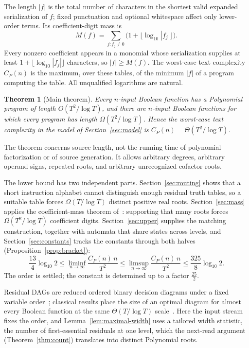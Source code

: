 \documentclass[11pt]{article}
\newtheorem{theorem}{Theorem}[section]
\theoremstyle{remark}
\begin{document}
The length $|f|$ is the total
number of characters in the shortest valid expanded serialization of $f$;
fixed punctuation and optional whitespace affect only lower-order terms.
Its coefficient-digit mass is
\[
  M(f)=\sum_{j:f_j\ne0}\bigl(1+\lfloor\log_{10}|f_j|\rfloor\bigr).
\]
Every nonzero coefficient appears in a monomial whose serialization supplies
at least $1+\lfloor\log_{10}|f_j|\rfloor$ characters, so $|f|\ge M(f)$.
The worst-case text complexity $C_P(n)$ is the maximum, over these tables, of
the minimum $|f|$ of a program computing the table.
All unqualified logarithms are natural.

\begin{theorem}[Main theorem]\label{thm:main}
Every $n$-input Boolean function has a Polynomial program of length
$O(T^2/\log T)$, and there are $n$-input Boolean functions for which every
program has length $\Omega(T^2/\log T)$.  Hence the
worst-case text complexity in the model of Section~\ref{sec:model} is
$C_P(n)=\Theta(T^2/\log T)$.
\end{theorem}

The theorem concerns source length, not the running time of polynomial
factorization or of source generation.  It allows arbitrary degrees,
arbitrary operand signs, repeated roots, and arbitrary unrecognized cofactor
roots.

The lower bound has two independent parts.  Section~\ref{sec:routing} shows
that a short instruction alphabet cannot distinguish enough residual truth
tables, so a suitable table forces $\Omega(T/\log T)$ distinct positive real
roots.  Section~\ref{sec:mass} applies the coefficient-mass theorem
of~\cite{coefficient-mass}: supporting that many roots forces
$\Omega(T^2/\log T)$ coefficient digits.  Section~\ref{sec:upper} supplies
the matching construction, together with automata that share states across
levels, and Section~\ref{sec:constants} tracks the constants through both
halves (Proposition~\ref{prop:bracket}):
\[
  \frac{13}{4}\log_{10}2\le\liminf_{n\to\infty}\frac{C_P(n)\,n}{T^2}
  \le\limsup_{n\to\infty}\frac{C_P(n)\,n}{T^2}
  \le\frac{325}{8}\log_{10}2 .
\]
The order is settled; the constant is determined up to a factor $\frac{25}2$.

Residual DAGs are reduced ordered binary decision diagrams under a fixed
variable order~\cite{bryant}; classical results place the size of an optimal
diagram for almost every Boolean function at the same
$\Theta(T/\log T)$ scale~\cite{wegener,gps}.  Here the input stream fixes the
order, and Lemma~\ref{lem:maximal-width} uses a tailored width statistic,
the number of first-essential residuals at one level, which the
next-read argument (Theorem~\ref{thm:count}) translates into distinct
Polynomial roots.
\end{document}
